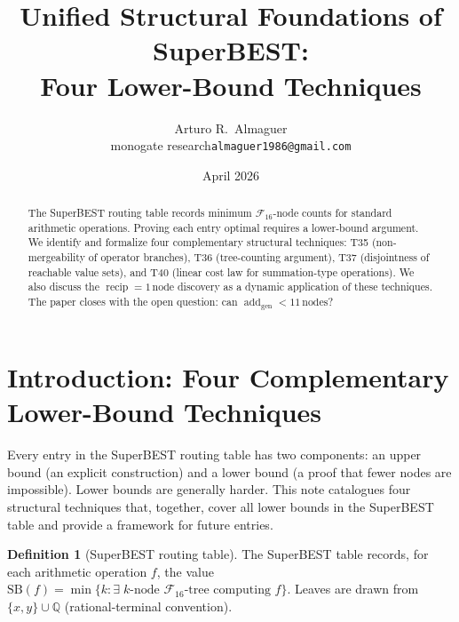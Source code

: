 \documentclass[12pt,a4paper]{article}
\title{Unified Structural Foundations of SuperBEST:\\
       Four Lower-Bound Techniques}
\author{Arturo R.\ Almaguer\\
  \small monogate research\quad\texttt{almaguer1986@gmail.com}}
\date{April 2026}
\theoremstyle{definition}
\newtheorem{definition}[theorem]{Definition}
\newcommand{\F}{\mathcal{F}_{16}}
\newcommand{\SB}{\mathrm{SB}}
\newcommand{\recip}{\operatorname{recip}}
\newcommand{\addgen}{\operatorname{add}_{\mathrm{gen}}}
\begin{document}
\maketitle

\begin{abstract}
The SuperBEST routing table records minimum $\mathcal{F}_{16}$-node counts
for standard arithmetic operations.  Proving each entry optimal requires a
lower-bound argument.  We identify and formalize four complementary structural
techniques: T35 (non-mergeability of operator branches), T36 (tree-counting
argument), T37 (disjointness of reachable value sets), and T40 (linear cost
law for summation-type operations).  We also discuss the $\recip = 1\,\text{node}$
discovery as a dynamic application of these techniques.  The paper closes with
the open question: can $\addgen < 11\,\text{nodes}$?
\end{abstract}

\section{Introduction: Four Complementary Lower-Bound Techniques}
\label{sec:intro}

Every entry in the SuperBEST routing table has two components: an upper bound
(an explicit construction) and a lower bound (a proof that fewer nodes are
impossible).  Lower bounds are generally harder.  This note catalogues four
structural techniques that, together, cover all lower bounds in the SuperBEST
table and provide a framework for future entries.

\begin{definition}[SuperBEST routing table]
The SuperBEST table records, for each arithmetic operation $f$,
the value $\SB(f) = \min\{k : \exists\;\text{$k$-node $\F$-tree computing $f$}\}$.
Leaves are drawn from $\{x,y\}\cup\mathbb{Q}$ (rational-terminal convention).
\end{definition}
\end{document}
